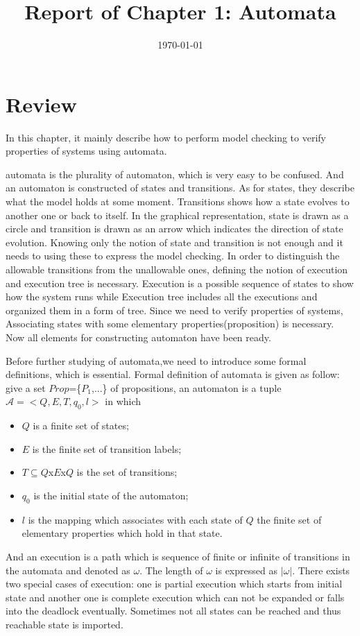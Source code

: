 \documentclass[11pt, conference]{IEEEtran}
\begin{document}
    \title{Report of Chapter 1: Automata}
    \author{}
    \date{\today}
    \maketitle

    \section{Review}
    In this chapter, it mainly describe how to perform model checking to verify properties of systems using automata.

    automata is the plurality of automaton, which is very easy to be confused. And an automaton is constructed of states and transitions. As for states, they describe what the model holds at some moment. Transitions shows how a state evolves to another one or back to itself. In the graphical representation, state is drawn as a circle and transition is drawn as an arrow which indicates the direction of state evolution. Knowing only the notion of state and transition is not enough and it needs to using these to express the model checking. In order to distinguish the allowable transitions from the unallowable ones, defining the notion of execution and execution tree is necessary. Execution is a possible sequence of states to show how the system runs while Execution tree includes all the executions and organized them in a form of tree. Since we need to verify properties of systems, Associating states with some elementary properties(proposition) is necessary. Now all elements for constructing automaton have been ready.

    Before further studying of automata,we need to introduce some formal definitions, which is essential. Formal definition of automata is given as follow: give a set $Prop$=\{$P_1$,...\} of propositions, an automaton is a tuple $\mathcal{A}=<Q, E, T, q_0, l>$ in which
    \begin{itemize}
      \item $Q$ is a finite set of states;
      \item $E$ is the finite set of transition labels;
      \item $T\subseteq Q$x$E$x$Q$ is the set of transitions;
      \item $q_0$ is the initial state of the automaton;
      \item $l$ is the mapping which associates with each state of $Q$ the finite set of elementary properties which hold in that state.
    \end{itemize}
    And an execution is a path which is sequence of finite or infinite of transitions in the automata and denoted as $\omega$. The length of $\omega$ is expressed as $|\omega|$. There exists two special cases of execution: one is partial execution which starts from initial state and another one is complete execution which can not be expanded or falls into the deadlock eventually. Sometimes not all states can be reached and thus reachable state is imported.
\end{document}
